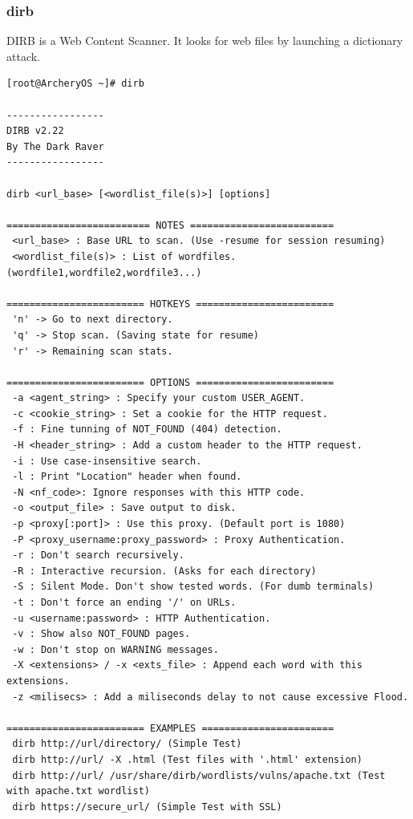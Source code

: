 \documentclass{article}
\begin{document}
\subsubsection{dirb}
DIRB is a Web Content Scanner. It looks for web files by launching a dictionary attack.
\begin{lstlisting}
[root@ArcheryOS ~]# dirb

-----------------
DIRB v2.22    
By The Dark Raver
-----------------

dirb <url_base> [<wordlist_file(s)>] [options]

========================= NOTES =========================
 <url_base> : Base URL to scan. (Use -resume for session resuming)
 <wordlist_file(s)> : List of wordfiles. (wordfile1,wordfile2,wordfile3...)

======================== HOTKEYS ========================
 'n' -> Go to next directory.
 'q' -> Stop scan. (Saving state for resume)
 'r' -> Remaining scan stats.

======================== OPTIONS ========================
 -a <agent_string> : Specify your custom USER_AGENT.
 -c <cookie_string> : Set a cookie for the HTTP request.
 -f : Fine tunning of NOT_FOUND (404) detection.
 -H <header_string> : Add a custom header to the HTTP request.
 -i : Use case-insensitive search.
 -l : Print "Location" header when found.
 -N <nf_code>: Ignore responses with this HTTP code.
 -o <output_file> : Save output to disk.
 -p <proxy[:port]> : Use this proxy. (Default port is 1080)
 -P <proxy_username:proxy_password> : Proxy Authentication.
 -r : Don't search recursively.
 -R : Interactive recursion. (Asks for each directory)
 -S : Silent Mode. Don't show tested words. (For dumb terminals)
 -t : Don't force an ending '/' on URLs.
 -u <username:password> : HTTP Authentication.
 -v : Show also NOT_FOUND pages.
 -w : Don't stop on WARNING messages.
 -X <extensions> / -x <exts_file> : Append each word with this extensions.
 -z <milisecs> : Add a miliseconds delay to not cause excessive Flood.

======================== EXAMPLES =======================
 dirb http://url/directory/ (Simple Test)
 dirb http://url/ -X .html (Test files with '.html' extension)
 dirb http://url/ /usr/share/dirb/wordlists/vulns/apache.txt (Test with apache.txt wordlist)
 dirb https://secure_url/ (Simple Test with SSL)
\end{lstlisting}
\end{document}
